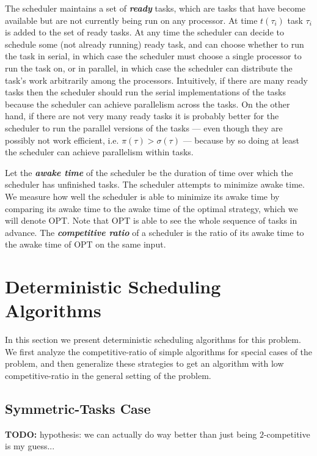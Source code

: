 \documentclass[twocolumn]{article}[10pt]
\newcommand{\defn}[1]{{\textit{\textbf{\boldmath #1}}}\xspace}
\newcommand{\todo}[1]{{\color{red}\textbf{TODO:} #1}}
\begin{document}
The scheduler maintains a set of \defn{ready} tasks, which are
tasks that have become available but are not currently being run
on any processor. At time $t(\tau_i)$ task $\tau_i$ is added to
the set of ready tasks. At any time the scheduler can decide to
schedule some (not already running) ready task, and can choose
whether to run the task in serial, in which case the scheduler
must choose a single processor to run the task on, or in
parallel, in which case the scheduler can distribute the task's
work arbitrarily among the processors. Intuitively, if there are
many ready tasks then the scheduler should run the serial
implementations of the tasks because the scheduler can achieve
parallelism across the tasks. On the other hand, if there are not
very many ready tasks it is probably better for the scheduler to
run the parallel versions of the tasks --- even though they are
possibly not work efficient, i.e. $\pi(\tau) > \sigma(\tau)$ ---
because by so doing at least the scheduler can achieve
parallelism within tasks.

Let the \defn{awake time} of the scheduler be the duration of
time over which the scheduler has unfinished tasks.
The scheduler attempts to minimize awake time.
We measure how well the scheduler is able to minimize its awake
time by comparing its awake time to the awake time of the optimal
strategy, which we will denote OPT. Note that OPT is able to see
the whole sequence of tasks in advance.
The \defn{competitive ratio} of a scheduler is the ratio
of its awake time to the awake time of OPT on the same input.

\section{Deterministic Scheduling Algorithms}

In this section we present deterministic scheduling algorithms
for this problem. We first analyze the competitive-ratio of
simple algorithms for special cases of the problem, and then
generalize these strategies to get an algorithm with low
competitive-ratio in the general setting of the problem.

\subsection{Symmetric-Tasks Case}
\label{subsec:symmetrictasks}
\todo{hypothesis: we can actually do way better than just being
$2$-competitive is my guess...}
\end{document}
